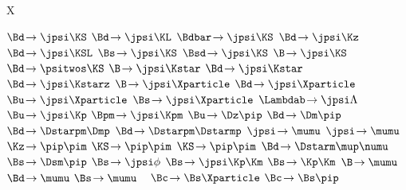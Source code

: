 
\newmathsymbol{\BF}           {\xspace}
\newmathsymbol{\BR}           {\BF}

\renewcommand{\to}            {\ensuremath{\rightarrow}\xspace}
\newcommand{\decay}[2]        {\ensuremath{#1\!\to #2}\xspace}
\newcommand{\decaybf}[2]      {\ensuremath{#1\!\pmb{\to} #2}\xspace} %

\newmathsymbol{\Xparticle}      {X\xspace}

\newmathsymbol{\BdToJpsiKS}      {\decay{\Bd}{\jpsi\KS}}
\newmathsymbol{\BdToJpsiKL}      {\decay{\Bd}{\jpsi\KL}}
\newmathsymbol{\BdbarToJpsiKS}   {\decay{\Bdbar}{\jpsi\KS}}
\newmathsymbol{\BdToJpsiKz}      {\decay{\Bd}{\jpsi\Kz}}
\newmathsymbol{\BdbarToJpsiKzbar}{\decay{\Bdbar}{\jpsi\Kzbar}}
\newmathsymbol{\BdToJpsiKSL}     {\decay{\Bd}{\jpsi\KSL}}
\newmathsymbol{\BsToJpsiKS}      {\decay{\Bs}{\jpsi\KS}}
\newmathsymbol{\BsdToJpsiKS}     {\decay{\Bsd}{\jpsi\KS}}
\newmathsymbol{\BToJpsiKS}       {\decay{\B}{\jpsi\KS}}
\newmathsymbol{\BdToPsiTwoSKS}   {\decay{\Bd}{\psitwos\KS}}
\newmathsymbol{\BToJpsiKstar}    {\decay{\B}{\jpsi\Kstar}}
\newmathsymbol{\BdToJpsiKstar}   {\decay{\Bd}{\jpsi\Kstar}}
\newmathsymbol{\BdToJpsiKstarz}  {\decay{\Bd}{\jpsi\Kstarz}}
\newmathsymbol{\BToJpsiX}        {\decay{\B}{\jpsi\Xparticle}}
\newmathsymbol{\BdToJpsiX}       {\decay{\Bd}{\jpsi\Xparticle}}
\newmathsymbol{\BuToJpsiX}       {\decay{\Bu}{\jpsi\Xparticle}}
\newmathsymbol{\BsToJpsiX}       {\decay{\Bs}{\jpsi\Xparticle}}
\newmathsymbol{\LbToJpsiLambda}  {\decay{\Lambdab}{\jpsi\Lambda}}
\newmathsymbol{\BuToJpsiK}       {\decay{\Bu}{\jpsi\Kp}}
\newmathsymbol{\BuToJpsiKcc}     {\decay{\Bpm}{\jpsi\Kpm}}
\newmathsymbol{\BuToDpi}         {\decay{\Bu}{\Dz\pip}}
\newmathsymbol{\BdToDpi}         {\decay{\Bd}{\Dm\pip}}
\newmathsymbol{\BdToDstarD}      {\decay{\Bd}{\Dstarpm\Dmp}}
\newmathsymbol{\BdToDstarDstar}  {\decay{\Bd}{\Dstarpm\Dstarmp}}
\newmathsymbol{\JpsiToMuMu}      {\decay{\jpsi}{\mumu}}
\newmathsymbol{\JpsiTomumu}      {\decay{\jpsi}{\mumu}}
\newmathsymbol{\KzToPiPi}        {\decay{\Kz}{\pip\pim}}
\newmathsymbol{\KSToPiPi}        {\decay{\KS}{\pip\pim}}
\newmathsymbol{\KSTopipi}        {\decay{\KS}{\pip\pim}}
\newmathsymbol{\BdToDstarmunu}   {\decay{\Bd}{\Dstarm\mup\numu}}
\newmathsymbol{\BsToDspi}        {\decay{\Bs}{\Dsm\pip}}
\newmathsymbol{\BsToJpsiphi}     {\decay{\Bs}{\jpsi\phi}}
\newmathsymbol{\BsToJpsiKK}      {\decay{\Bs}{\jpsi\Kp\Km}}
\newmathsymbol{\BsToKK}          {\decay{\Bs}{\Kp\Km}}
\newmathsymbol{\BToMuMu}         {\decay{\B}{\mumu}}
\newmathsymbol{\BdToMuMu}        {\decay{\Bd}{\mumu}}
\newmathsymbol{\BsToMuMu}        {\decay{\Bs}{\mumu}}
\newmathsymbol{\inclJPsi}        {\ \jpsi}
\newmathsymbol{\BcToBsX}         {\decay{\Bc}{\Bs\Xparticle}}
\newmathsymbol{\BcToBspi}        {\decay{\Bc}{\Bs\pip}}

